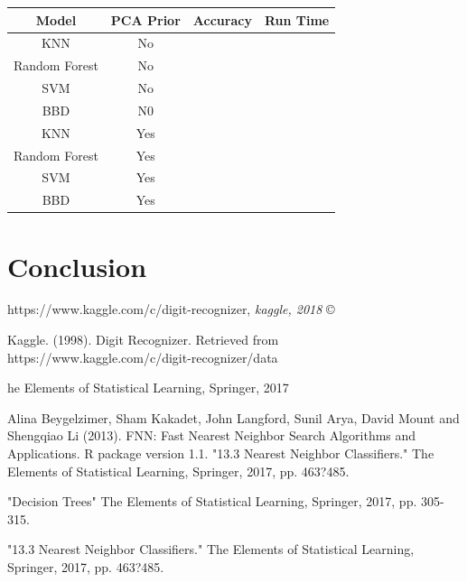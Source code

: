 \documentclass[11pt, oneside]{article}   	%
\begin{document}
\begin{center}
\begin{tabular}{ |c|c|c|c| } 
\hline
Model & PCA Prior & Accuracy & Run Time\\
 \hline \hline
  KNN & No &  & \\ 
Random Forest & No &  & \\ 
 SVM & No &  & \\ 
 BBD & N0 &  & \\
 \hline
 KNN & Yes &  & \\ 
Random Forest & Yes &  & \\ 
 SVM & Yes &  & \\ 
 BBD & Yes &  & \\
 \hline
\end{tabular}
\end{center}

\section{Conclusion}


\begin{thebibliography}{9}

https://www.kaggle.com/c/digit-recognizer, \textit{kaggle, 2018} \copyright
 
Kaggle. (1998). Digit Recognizer. Retrieved from https://www.kaggle.com/c/digit-recognizer/data 

he Elements of Statistical Learning, Springer, 2017

Alina Beygelzimer, Sham Kakadet, John Langford, Sunil Arya, David Mount and Shengqiao
  Li (2013). FNN: Fast Nearest Neighbor Search Algorithms and Applications. R package
  version 1.1.
"13.3 Nearest Neighbor Classifiers." The Elements of Statistical Learning, Springer, 2017, pp. 463?485. 

"Decision Trees" The Elements of Statistical Learning, Springer, 2017, pp. 305-315.

"13.3 Nearest Neighbor Classifiers." The Elements of Statistical Learning, Springer, 2017, pp. 463?485.
 
\end{thebibliography}
\end{document}
